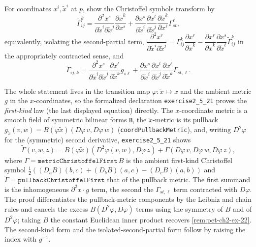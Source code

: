 \begin{remark}
  \label{rem:pet-ch2-ex-21}
  \leanok
  For coordinates $x^i,\tilde x^i$ at $p$, show the Christoffel symbols
  transform by
  \[
    \tilde\Gamma^k_{ij}
    = \frac{\partial^2x^s}{\partial\tilde x^i\partial\tilde x^j}\frac{\partial\tilde x^k}{\partial x^s}
    + \frac{\partial x^s}{\partial\tilde x^i}\frac{\partial x^t}{\partial\tilde x^j}\frac{\partial\tilde x^k}{\partial x^\ell}\Gamma^\ell_{st},
  \]
  equivalently, isolating the second-partial term,
  $\dfrac{\partial^2x^r}{\partial\tilde x^i\partial\tilde x^j}
  = \Gamma^k_{ij}\dfrac{\partial x^r}{\partial\tilde x^k}
  -\dfrac{\partial x^r}{\partial\tilde x^k}\dfrac{\partial x^s}{\partial\tilde x^\ell}\tilde\Gamma^k_{ij}$
  in the appropriately contracted sense, and
  \[
    \tilde\Gamma_{ij,k}
    = \frac{\partial^2x^s}{\partial\tilde x^i\partial\tilde x^j}\frac{\partial x^\ell}{\partial\tilde x^k}g_{s\ell}
    + \frac{\partial x^s}{\partial\tilde x^i}\frac{\partial x^t}{\partial\tilde x^j}\frac{\partial x^\ell}{\partial\tilde x^k}\Gamma_{st,\ell}.
  \]

  The whole statement lives in the transition map $\varphi:\tilde x\mapsto x$ and
  the ambient metric $g$ in the $x$-coordinates, so the formalized declaration
  \texttt{exercise2\_5\_21} proves the \emph{first-kind} law (the last displayed
  equation) directly. The $x$-coordinate metric is a smooth field of symmetric
  bilinear forms \texttt{B}, the $\tilde x$-metric is its pullback
  $g_{\tilde x}(v,w)=B(\varphi\tilde x)(D\varphi\,v,D\varphi\,w)$
  (\texttt{coordPullbackMetric}), and, writing $D^2\varphi$ for the (symmetric) second
  derivative, \texttt{exercise2\_5\_21} shows
  \[
    \tilde\Gamma(v,w,z)=B(\varphi\tilde x)\!\left(D^2\varphi(v,w),D\varphi\,z\right)
      +\Gamma\!\left(D\varphi\,v,D\varphi\,w,D\varphi\,z\right),
  \]
  where $\Gamma=\texttt{metricChristoffelFirst}\,B$ is the ambient first-kind
  Christoffel symbol $\tfrac12\!\left((D_aB)(b,c)+(D_bB)(a,c)-(D_cB)(a,b)\right)$
  and $\tilde\Gamma=\texttt{pullbackChristoffelFirst}$ that of the pullback
  metric. The first summand is the inhomogeneous
  $\partial^2x\cdot g$ term, the second the $\Gamma_{st,\ell}$ term contracted
  with $D\varphi$. The proof differentiates the pullback-metric components by the
  Leibniz and chain rules and cancels the excess $B(D^2\varphi,D\varphi)$ terms
  using the symmetry of $B$ and of $D^2\varphi$; taking $B$ the constant Euclidean
  inner product recovers \cref{rem:pet-ch2-ex-22}. The second-kind form and the
  isolated-second-partial form follow by raising the index with $g^{-1}$.
\end{remark}

